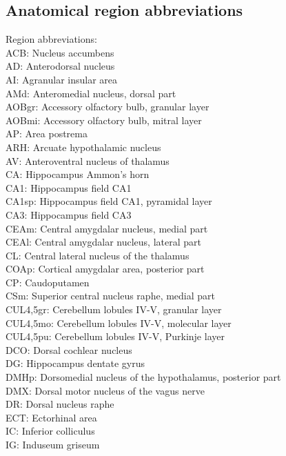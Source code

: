 \subsection{Anatomical region abbreviations}
Region abbreviations:\\
ACB: Nucleus accumbens\\
AD: Anterodorsal nucleus\\
AI: Agranular insular area\\
AMd: Anteromedial nucleus, dorsal part\\ 
AOBgr: Accessory olfactory bulb, granular layer\\ 
AOBmi: Accessory olfactory bulb, mitral layer\\
AP: Area postrema \\
ARH: Arcuate hypothalamic nucleus\\ 
AV: Anteroventral nucleus of thalamus\\ 
CA: Hippocampus Ammon’s horn \\
CA1: Hippocampus field CA1 \\
CA1sp: Hippocampus field CA1, pyramidal layer\\ 
CA3: Hippocampus field CA3 \\
CEAm: Central amygdalar nucleus, medial part\\ 
CEAl: Central amygdalar nucleus, lateral part \\
CL: Central lateral nucleus of the thalamus \\
COAp: Cortical amygdalar area, posterior part \\
CP: Caudoputamen \\
CSm: Superior central nucleus raphe, medial part\\ 
CUL4,5gr: Cerebellum lobules IV-V, granular layer \\
CUL4,5mo: Cerebellum lobules IV-V, molecular layer \\
CUL4,5pu: Cerebellum lobules IV-V, Purkinje layer \\
DCO: Dorsal cochlear nucleus \\
DG: Hippocampus dentate gyrus \\
DMHp: Dorsomedial nucleus of the hypothalamus, posterior part \\
DMX: Dorsal motor nucleus of the vagus nerve \\
DR: Dorsal nucleus raphe \\
ECT: Ectorhinal area \\
IC: Inferior colliculus\\ 
IG: Induseum griseum \\
